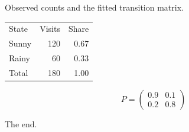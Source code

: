 \documentclass{article}
\begin{document}
Observed counts and the fitted transition matrix.

\noindent\begin{minipage}{0.5\textwidth}
\begin{tabular}{lrr}
State & Visits & Share \\
Sunny & 120 & 0.67 \\
Rainy & 60 & 0.33 \\
Total & 180 & 1.00 \\
\end{tabular}
\end{minipage}\hfill
\begin{minipage}{0.45\textwidth}
\[ P = \begin{pmatrix} 0.9 & 0.1 \\ 0.2 & 0.8 \end{pmatrix} \]
\end{minipage}

The end.
\end{document}

